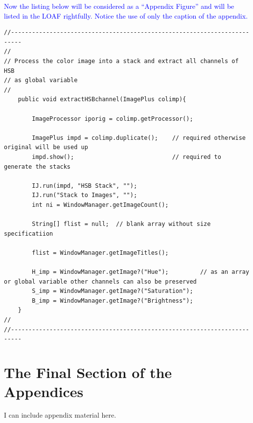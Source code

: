 \documentclass[phd]{ndsu-thesis-2022}
\newcommand\italk[1]{\textcolor{blue}{#1}}  %
\begin{document}



\italk{Now the listing below will be considered as a ``Appendix Figure'' and will be listed in the LOAF rightfully. Notice the use of only the caption of the appendix.}

{\singlespacing
\begin{lstlisting}
//-------------------------------------------------------------------------
//
// Process the color image into a stack and extract all channels of HSB 
// as global variable
//
	public void extractHSBchannel(ImagePlus colimp){

		ImageProcessor iporig = colimp.getProcessor();
		
		ImagePlus impd = colimp.duplicate();	// required otherwise original will be used up
		impd.show();						    // required to generate the stacks
		
		IJ.run(impd, "HSB Stack", "");
		IJ.run("Stack to Images", "");
		int ni = WindowManager.getImageCount();

		String[] flist = null;  // blank array without size specificatiion

		flist = WindowManager.getImageTitles();
		
		H_imp = WindowManager.getImage?("Hue");			// as an array or global variable other channels can also be preserved
		S_imp = WindowManager.getImage?("Saturation");
		B_imp = WindowManager.getImage?("Brightness");
	}	
//
//-------------------------------------------------------------------------	
\end{lstlisting}
}


\newpage
\section{The Final Section of the Appendices}
I can include appendix material here. 
\end{document}
